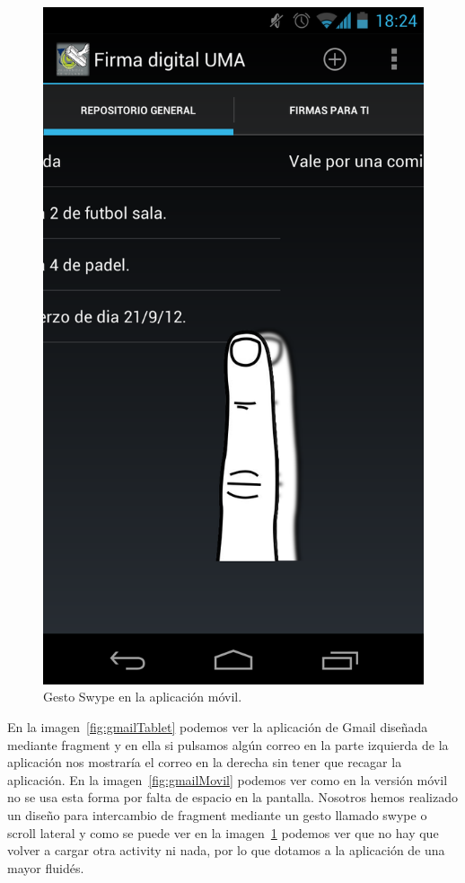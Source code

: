\begin{figure}[h]
  \centering
    \includegraphics[scale=0.2]{./Android/imagenes/swype.png}
  \caption{Gesto Swype en la aplicación móvil.}
  \label{fig:swype}
\end{figure}

En la imagen~\ref{fig:gmailTablet} podemos ver la aplicación de Gmail diseñada mediante fragment y en ella si pulsamos algún correo en la parte izquierda de la aplicación nos mostraría el correo en la derecha sin tener que recagar la aplicación. En la imagen~\ref{fig:gmailMovil} podemos ver como en la versión móvil no se usa esta forma por falta de espacio en la pantalla. Nosotros hemos realizado un diseño para intercambio de fragment mediante un gesto llamado swype o scroll lateral y como se puede ver en la imagen~\ref{fig:swype} podemos ver que no hay que volver a cargar otra activity ni nada, por lo que dotamos a la aplicación de una mayor fluidés.

